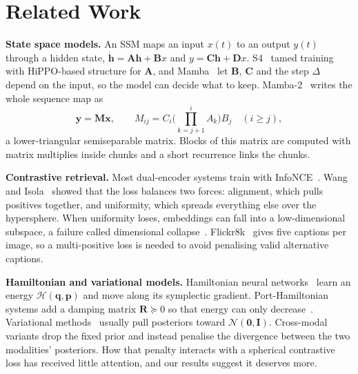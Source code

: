 \documentclass[pdflatex,sn-mathphys-num]{sn-jnl}
\begin{document}
\section{Related Work}
\label{sec:related}

\textbf{State space models.} An SSM maps an input $x(t)$ to an output $y(t)$ through a hidden state, $\dot{\mathbf{h}}=\mathbf{A}\mathbf{h}+\mathbf{B}x$ and $y=\mathbf{C}\mathbf{h}+\mathbf{D}x$. S4~\cite{gu2022efficiently} tamed training with HiPPO-based structure for $\mathbf{A}$, and Mamba~\cite{gu2023mamba} let $\mathbf{B}$, $\mathbf{C}$ and the step $\Delta$ depend on the input, so the model can decide what to keep. Mamba-2~\cite{dao2024transformers} writes the whole sequence map as
\begin{equation}
\mathbf{y}=\mathbf{M}\mathbf{x},\qquad M_{ij}=C_i\Big(\textstyle\prod_{k=j+1}^{i}A_k\Big)B_j\quad(i\ge j),
\label{eq:ssd}
\end{equation}
a lower-triangular semiseparable matrix. Blocks of this matrix are computed with matrix multiplies inside chunks and a short recurrence links the chunks.

\textbf{Contrastive retrieval.} Most dual-encoder systems train with InfoNCE~\cite{oord2018representation,chen2020simple,he2020momentum}. Wang and Isola~\cite{wang2020understanding} showed that the loss balances two forces: alignment, which pulls positives together, and uniformity, which spreads everything else over the hypersphere. When uniformity loses, embeddings can fall into a low-dimensional subspace, a failure called dimensional collapse~\cite{jing2022understanding}. Flickr8k~\cite{hodosh2013framing} gives five captions per image, so a multi-positive loss is needed to avoid penalising valid alternative captions.

\textbf{Hamiltonian and variational models.} Hamiltonian neural networks~\cite{greydanus2019hamiltonian} learn an energy $\mathcal{H}(\mathbf{q},\mathbf{p})$ and move along its symplectic gradient. Port-Hamiltonian systems add a damping matrix $\mathbf{R}\succeq0$ so that energy can only decrease~\cite{vanderschaft2000}. Variational methods~\cite{kingma2014auto,alemi2017deep} usually pull posteriors toward $\mathcal{N}(\mathbf{0},\mathbf{I})$. Cross-modal variants drop the fixed prior and instead penalise the divergence between the two modalities' posteriors. How that penalty interacts with a spherical contrastive loss has received little attention, and our results suggest it deserves more.
\end{document}
